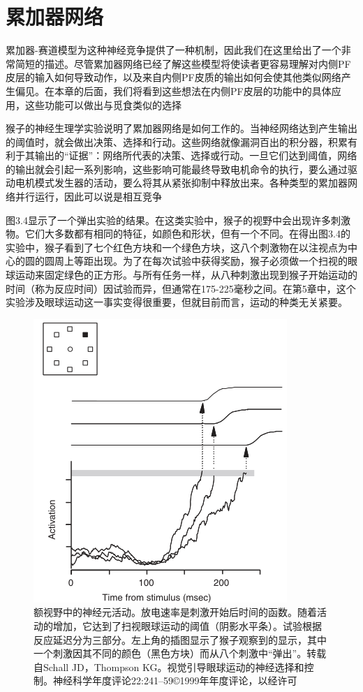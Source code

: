 \section{累加器网络}
累加器-赛道模型为这种神经竞争提供了一种机制，因此我们在这里给出了一个非常简短的描述。尽管累加器网络已经了解这些模型将使读者更容易理解对内侧PF皮层的输入如何导致动作，以及来自内侧PF皮质的输出如何会使其他类似网络产生偏见。在本章的后面，我们将看到这些想法在内侧PF皮层的功能中的具体应用，这些功能可以做出与觅食类似的选择\par
猴子的神经生理学实验说明了累加器网络是如何工作的。当神经网络达到产生输出的阈值时，就会做出决策、选择和行动。这些网络就像漏洞百出的积分器，积累有利于其输出的“证据”：网络所代表的决策、选择或行动。一旦它们达到阈值，网络的输出就会引起一系列影响，这些影响可能最终导致电机命令的执行，要么通过驱动电机模式发生器的活动，要么将其从紧张抑制中释放出来。各种类型的累加器网络并行运行，因此可以说是相互竞争\par
图3.4显示了一个弹出实验的结果。在这类实验中，猴子的视野中会出现许多刺激物。它们大多数都有相同的特征，如颜色和形状，但有一个不同。在得出图3.4的实验中，猴子看到了七个红色方块和一个绿色方块，这八个刺激物在以注视点为中心的圆的圆周上等距出现。为了在每次试验中获得奖励，猴子必须做一个扫视的眼球运动来固定绿色的正方形。与所有任务一样，从八种刺激出现到猴子开始运动的时间（称为反应时间）因试验而异，但通常在175-225毫秒之间。在第5章中，这个实验涉及眼球运动这一事实变得很重要，但就目前而言，运动的种类无关紧要。\par
\begin{figure}[!htb]
	\centering
	\includegraphics{image_pfc/Fig_3_4}
	\caption{额视野中的神经元活动。放电速率是刺激开始后时间的函数。随着活动的增加，它达到了扫视眼球运动的阈值（阴影水平条）。试验根据反应延迟分为三部分。左上角的插图显示了猴子观察到的显示，其中一个刺激因其不同的颜色（黑色方块）而从八个刺激中“弹出”。转载自Schall JD，Thompson KG。视觉引导眼球运动的神经选择和控制。神经科学年度评论22:241–59©1999年年度评论，以经许可}
	\label{fig:fig}
\end{figure}
